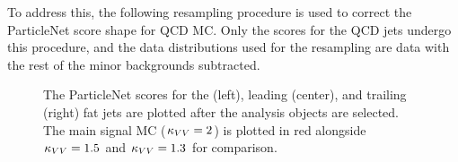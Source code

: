 To address this, the following resampling procedure is used to correct the ParticleNet score shape for QCD MC. 
Only the scores for the QCD jets undergo this procedure, and the data distributions used for the resampling are data with the rest of the minor backgrounds subtracted.

\begin{figure}[htb]
    \centering
    \qquad
    \qquad
    \caption{
        The ParticleNet scores for the \Htobb (left), leading \Vtoqq (center), and trailing \Vtoqq (right) fat jets are plotted after the analysis objects are selected. 
        The main signal MC ($\kappa_{VV} = 2$) is plotted in red alongside $\kappa_{VV} = 1.5$ and $\kappa_{VV} = 1.3$ for comparison. 
    }
    \label{fig:vbsvvh_dataMC_fatjet_scores_noCorr}
\end{figure}

